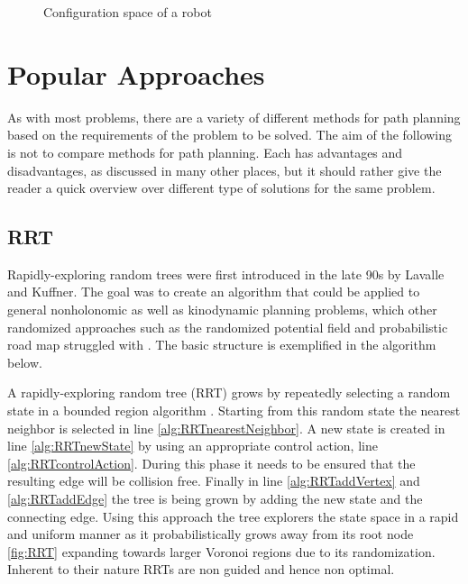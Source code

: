 \begin{figure}[h]
    \caption{Configuration space of a robot}
    \label{fig:configurationSpace}
\end{figure}

\section{Popular Approaches}
As with most problems, there are a variety of different methods for path planning based on the requirements of the problem to be solved. The aim of the following is not to compare methods for path planning. Each has advantages and disadvantages, as discussed in many other places, but it should rather give the reader a quick overview over different type of solutions for the same problem. %

\subsection{RRT}
Rapidly-exploring random trees were first introduced in the late 90s by Lavalle and Kuffner. The goal was to create an algorithm that could be applied to general nonholonomic as well as kinodynamic planning problems, which other randomized approaches such as the randomized potential field and probabilistic road map struggled with \cite{Lavalle.1998}. The basic structure is exemplified in the algorithm below.

A rapidly-exploring random tree (RRT) grows by repeatedly selecting a random state in a bounded region algorithm . Starting from this random state the nearest neighbor is selected in line \ref{alg:RRTnearestNeighbor}. A new state is created in line \ref{alg:RRTnewState} by using an appropriate control action, line \ref{alg:RRTcontrolAction}. During this phase it needs to be ensured that the resulting edge will be collision free. Finally in line \ref{alg:RRTaddVertex} and \ref{alg:RRTaddEdge} the tree is being grown by adding the new state and the connecting edge. Using this approach the tree explorers the state space in a rapid and uniform manner as it probabilistically grows away from its root node \ref{fig:RRT} expanding towards larger Voronoi regions due to its randomization. Inherent to their nature RRTs are non guided and hence non optimal. \cite{Lavalle.1999}

